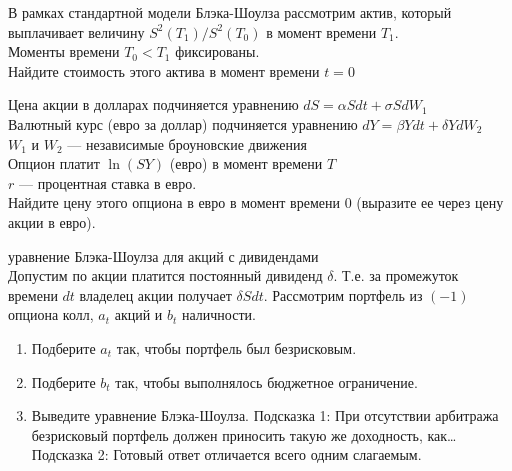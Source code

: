 \begin{problem}
В рамках стандартной модели Блэка-Шоулза рассмотрим актив, который выплачивает величину $S^{2}(T_{1})/S^{2}(T_{0})$ в момент времени $T_{1}$. \\
Моменты времени $T_{0}<T_{1}$ фиксированы. \\
Найдите стоимость этого актива в момент времени $t=0$

\begin{sol}

\end{sol}
\end{problem}

\begin{problem}
Цена акции в долларах подчиняется уравнению $dS=\alpha Sdt+\sigma SdW_{1}$ \\
Валютный курс (евро за доллар) подчиняется уравнению $dY=\beta Ydt+\delta YdW_{2}$ \\
$W_{1}$ и $W_{2}$ — независимые броуновские движения \\
Опцион платит $\ln(SY)$ (евро) в момент времени $T$ \\
$r$ — процентная ставка в евро. \\
Найдите цену этого опциона в евро в момент времени $0$ (выразите ее через цену акции в евро).

\begin{sol}

\end{sol}
\end{problem}

\begin{problem}
 уравнение Блэка-Шоулза для акций с дивидендами \\
Допустим по акции платится постоянный дивиденд $\delta$. Т.е. за промежуток времени $dt$ владелец акции получает $\delta Sdt$. Рассмотрим портфель из $(-1)$ опциона колл, $a_{t}$ акций и $b_{t}$ наличности.
\begin{enumerate}
\item Подберите $a_{t}$ так, чтобы портфель был безрисковым.
\item Подберите $b_{t}$ так, чтобы выполнялось бюджетное ограничение.
\item Выведите уравнение Блэка-Шоулза.
Подсказка 1: При отсутствии арбитража безрисковый портфель должен приносить такую же доходность, как\ldots \\
Подсказка 2: Готовый ответ отличается всего одним слагаемым.
\end{enumerate}

\begin{sol}

\end{sol}
\end{problem}

